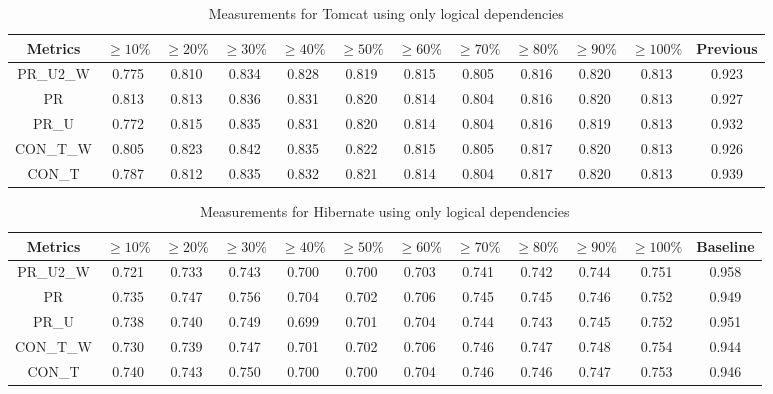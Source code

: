 \documentclass[runningheads]{comsis2}
\begin{document}
\begin{table}[!h]
\renewcommand{\arraystretch}{1}
\caption{Measurements for Tomcat using only logical dependencies}
\label{tab:measurementshistory:tomcat}
\centering
\begin{tabular}{|c|cccccccccc|c|}
\hline
Metrics &	$\geq10\%$	&	$\geq20\%$		&	$\geq30\%$		&	$\geq40\%$		&	$\geq50\%$		&	$\geq60\%$		&	$\geq70\%$		&	$\geq80\%$		&	$\geq90\%$		&	$\geq100\%$		&	Previous \\
\hline

PR\_U2\_W	&	0.775	&	0.810	&	0.834	&	0.828	&	0.819	&	0.815	&	0.805	&	0.816	&	0.820	&	0.813	&	0.923	\\
PR	&	0.813	&	0.813	&	0.836	&	0.831	&	0.820	&	0.814	&	0.804	&	0.816	&	0.820	&	0.813	&	0.927	\\
PR\_U	&	0.772	&	0.815	&	0.835	&	0.831	&	0.820	&	0.814	&	0.804	&	0.816	&	0.819	&	0.813	&	0.932	\\
CON\_T\_W	&	0.805	&	0.823	&	0.842	&	0.835	&	0.822	&	0.815	&	0.805	&	0.817	&	0.820	&	0.813	&	0.926	\\
CON\_T	&	0.787	&	0.812	&	0.835	&	0.832	&	0.821	&	0.814	&	0.804	&	0.817	&	0.820	&	0.813	&	0.939	\\

				
\hline
\end{tabular}

\end{table}


\begin{table}[!h]
\renewcommand{\arraystretch}{1}
\caption{Measurements for Hibernate using only logical dependencies}
\label{tab:measurementshistory:hibernate}
\centering
\begin{tabular}{|c|cccccccccc|c|}
\hline
Metrics &	$\geq10\%$	&	$\geq20\%$		&	$\geq30\%$		&	$\geq40\%$		&	$\geq50\%$		&	$\geq60\%$		&	$\geq70\%$		&	$\geq80\%$		&	$\geq90\%$		&	$\geq100\%$		&	Baseline \\
\hline

PR\_U2\_W	&	0.721	&	0.733	&	0.743	&	0.700	&	0.700	&	0.703	&	0.741	&	0.742	&	0.744	&	0.751	&	0.958	\\
PR	&	0.735	&	0.747	&	0.756	&	0.704	&	0.702	&	0.706	&	0.745	&	0.745	&	0.746	&	0.752	&	0.949	\\
PR\_U	&	0.738	&	0.740	&	0.749	&	0.699	&	0.701	&	0.704	&	0.744	&	0.743	&	0.745	&	0.752	&	0.951	\\
CON\_T\_W	&	0.730	&	0.739	&	0.747	&	0.701	&	0.702	&	0.706	&	0.746	&	0.747	&	0.748	&	0.754	&	0.944	\\
CON\_T	&	0.740	&	0.743	&	0.750	&	0.700	&	0.700	&	0.704	&	0.746	&	0.746	&	0.747	&	0.753	&	0.946	\\


\hline
\end{tabular}
\end{table}
\end{document}
